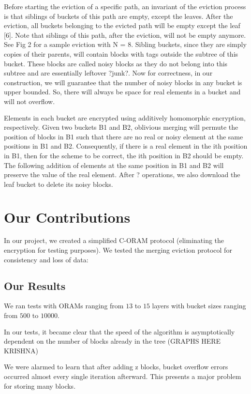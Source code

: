 \documentclass[12pt, oneside]{amsart}   	%
\begin{document}
Before starting the eviction of a specific path, an invariant of the eviction process is that siblings of buckets of this path are empty, except the leaves. After the eviction, all buckets belonging to the evicted path will be empty except the leaf [6]. Note that siblings of this path, after the eviction, will not be empty anymore. See Fig 2 for a sample eviction with N = 8.
Sibling buckets, since they are simply copies of their parents, will contain blocks with tags outside the subtree of this bucket. These blocks are called noisy blocks as they do not belong into this subtree and are essentially leftover ?junk?. Now for correctness, in our construction, we will guarantee that the number of noisy blocks in any bucket is upper bounded. So, there will always be space for real elements in a bucket and will not overflow.

Elements in each bucket are encrypted using additively homomorphic encryption, respectively. Given two buckets B1 and B2, oblivious merging will permute the position of blocks in B1 such that there are no real or noisy element at the same positions in B1 and B2. Consequently, if there is a real element in the ith position in B1, then for the scheme to be correct, the ith position in B2 should be empty. The following addition of elements at the same position in B1 and B2 will preserve the value of the real element. After ? operations, we also download the leaf bucket to delete its noisy blocks.

\section{Our Contributions}

In our project, we created a simplified C-ORAM protocol (eliminating the encryption for testing purposes). We tested the merging eviction protocol for consistency and loss of data:

\subsection{Our Results}

We ran tests with ORAMs ranging from $13$ to $15$ layers with bucket sizes ranging from $500$ to $10000$.

In our tests, it became clear that the speed of the algorithm is asymptotically dependent on the number of blocks already in the tree (GRAPHS HERE KRISHNA)

We were alarmed to learn that after adding z blocks, bucket overflow errors occurred almost every single iteration afterward. This presents a major problem for storing many blocks.
\end{document}
